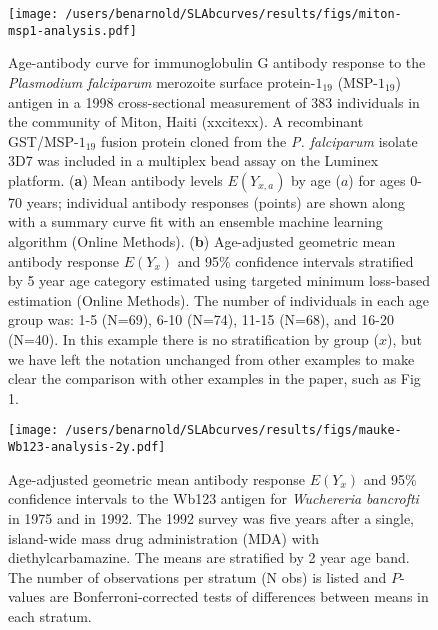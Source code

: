 \documentclass[11pt]{article}
\begin{document}
\clearpage
\begin{figure}[htbp]
\begin{center}
\texttt{[image: /users/benarnold/SLAbcurves/results/figs/miton-msp1-analysis.pdf]}
\begin{minipage}{\textwidth}
\caption{Age-antibody curve for immunoglobulin G antibody response to the \textit{Plasmodium falciparum} merozoite surface protein-$1_{19}$ (MSP-$1_{19}$) antigen in a 1998 cross-sectional measurement of 383 individuals in the community of Miton, Haiti (xxcitexx). A recombinant GST/MSP-$1_{19}$ fusion protein cloned from the \textit{P. falciparum} isolate 3D7 was included in a multiplex bead assay on the Luminex platform. (\textbf{a}) Mean antibody levels $E(Y_{x,a})$ by age ($a$) for ages 0-70 years; individual antibody responses (points) are shown along with a summary curve fit with an ensemble machine learning algorithm (Online Methods). (\textbf{b}) Age-adjusted geometric mean antibody response $E(Y_{x})$ and 95\% confidence intervals stratified by 5 year age category estimated using targeted minimum loss-based estimation (Online Methods). The number of individuals in each age group was: 1-5 (N=69), 6-10 (N=74), 11-15 (N=68), and 16-20 (N=40). In this example there is no stratification by group ($x$), but we have left the notation unchanged from other examples to make clear the comparison with other examples in the paper, such as Fig 1.}
\label{fig:mitonEYxa}
\end{minipage}
\end{center}
\end{figure}

\begin{figure}[htbp]
\begin{center}
\texttt{[image: /users/benarnold/SLAbcurves/results/figs/mauke-Wb123-analysis-2y.pdf]}
\begin{minipage}{0.75\textwidth}
\caption{Age-adjusted geometric mean antibody response $E(Y_{x})$ and 95\% confidence intervals to the Wb123 antigen for \textit{Wuchereria bancrofti} in 1975 and in 1992. The 1992 survey was five years after a single, island-wide mass drug administration (MDA) with diethylcarbamazine. The means are stratified by 2 year age band. The number of observations per stratum (N obs) is listed and $P$-values are Bonferroni-corrected tests of differences between means in each stratum.}
\label{fig:maukeS4}
\end{minipage}
\end{center}
\end{figure}
\end{document}
